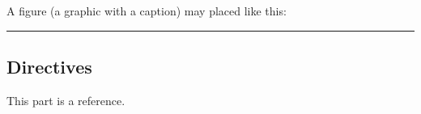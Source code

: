 \documentclass[letterpaper,10pt,english]{sphinxmanual}
\begin{document}
A figure (a graphic with a caption) may placed like this:

\begin{sphinxVerbatim}[commandchars=\\\{\}]
  

    
\end{sphinxVerbatim}


\bigskip\hrule\bigskip



\subsection{Directives}
\label{\detokenize{guide/99_rst-guide:directives}}\label{\detokenize{guide/99_rst-guide:the-reference}}
This part is a reference.



\renewcommand{\indexname}{Index}
\printindex
\end{document}
